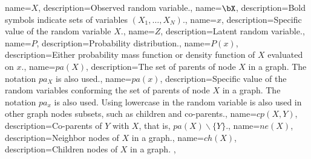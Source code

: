 {
  name={\(X\)},
  description={Observed random variable.},
}
{
  name={\(\bX\)},
  description={Bold symbols indicate sets of variables \((X_{1},\dots,X_{N})\).},
}
{
  name={\(x\)},
  description={Specific value of the random variable \(X\).},
}
{
  name={\ensuremath{Z}},
  description={Latent random variable.},
}
{
  name={\ensuremath{P}},
  description={Probability distribution.},
}
{
  name={\ensuremath{P(x)}},
  description={Either probability mass function or density function of \(X\) evaluated on \(x\).},
}
{
  name={\ensuremath{pa(X)}},
  description={The set of parents of node \(X\) in a graph. The notation \(pa_{X}\) is also used.},
}
{
  name={\ensuremath{pa(x)}},
  description={Specific value of the random variables conforming the set of parents of node \(X\) in a graph. The notation \(pa_{x}\) is also used. Using lowercase in the random variable is also used in other graph nodes subsets, such as children and co-parents.},
}
{
  name={\ensuremath{cp(X,Y)}},
  description={Co-parents of \(Y\) with \(X\), that is, \(pa(X)\backslash \{Y\}\).},
}
{
  name={\ensuremath{ne(X)}},
  description={Neighbor nodes of \(X\) in a graph.},
}
{
  name={\ensuremath{ch(X)}},
  description={Children nodes of \(X\) in a graph. },
}
